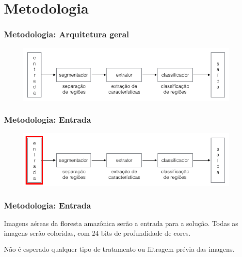 \documentclass[t]{beamer}
\begin{document}
%
%

%
%

%
%


\section{Metodologia}

\begin{frame}[c]
	\frametitle{Metodologia: Arquitetura geral}
	\begin{figure}[h]
    	\includegraphics[width=\textwidth]{imgs/arquitetura_geral}
	\end{figure}
\end{frame}

\begin{frame}[c]
	\frametitle{Metodologia: Entrada}
	\begin{figure}[h]
    	\includegraphics[width=\textwidth]{imgs/arquitetura_1}
	\end{figure}
\end{frame}

\begin{frame}[c] 
	\frametitle{Metodologia: Entrada}
	
	Imagens aéreas da floresta amazônica serão a entrada para a solução. Todas as imagens serão coloridas, com 24 bits de profundidade de cores.

	\vspace{0.5cm}

	Não é esperado qualquer tipo de tratamento ou filtragem prévia das imagens.
\end{frame}
\end{document}
